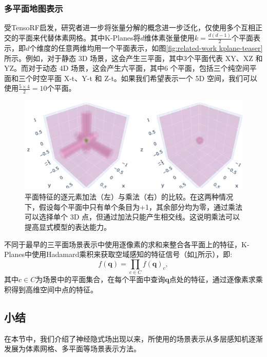 \subsubsection{多平面地图表示}
受TensoRF启发，研究者进一步将张量分解的概念进一步泛化，仅使用多个互相正交的平面来代替体素网格\cite{fridovich-keil_k-planes_2023, cao_hexplane_2023, reiser_merf_2023, chan_efficient_2022}。其中K-Planes\cite{fridovich-keil_k-planes_2023}将$d$维体素张量使用$k=\frac{d(d-1)}{2}$个平面表示，即$d$个维度的任意两维均用一个平面表示，如图\ref{fig:related-work kplane-teaser}所示。例如，对于静态 3D 场景，这会产生三平面，其中3个平面代表 XY、XZ 和 YZ。而对于动态 4D 场景，这会产生六平面，其中6 个平面，包括三个纯空间平面和三个时空平面 X-t、Y-t 和 Z-t。如果我们希望表示一个 5D 空间，我们可以使用$\frac{5\times4}{2}=10$个平面。


\begin{figure}[h]
    \centering
    \includegraphics[width=\textwidth]{undergraduate-thesis/images/related-work/hadamard-product.png}
    \caption{平面特征的逐元素加法（左）与乘法（右）的比较。在这两种情况下，假设每个平面中只有单个条目为+1，其余部分均为零，通过乘法可以选择单个 3D 点，但通过加法只能产生相交线。这说明乘法可以提高显式模型的表达能力。}
    \label{fig:related-work hadamard-product}
\end{figure}

不同于最早的三平面场景表示\cite{chan_efficient_2022}中使用逐像素的求和来整合各平面上的特征，K-Planes中使用Hadamard乘积来获取空域感知的特征信号（如\ref{fig:related-work hadamard-product}所示），即:
\begin{equation}
    f(\mathbf{q}) = \prod_{c\in C}f(\mathbf{q})_c,
\end{equation}
其中$c\in C$为场景中的平面集合，在每个平面中查询$\mathbf{q}$点处的特征，通过逐像素求乘积得到高维空间中点的特征。

\subsection{小结}
在本节中，我们介绍了神经隐式场出现以来，所使用的场景表示从多层感知机\cite{mildenhall_nerf_2020,park_deepsdf_2019, mescheder_occupancy_2019, shim_snerl_2023, zhi_-place_2021}逐渐发展为体素网格\cite{fridovich-keil_plenoxels_2022,yu_monosdf_2022,muller_instant_2022,jiang_instantavatar_2022}、多平面\cite{chen_tensorf_2022,fridovich-keil_k-planes_2023,cao_hexplane_2023}等场景表示方法。

